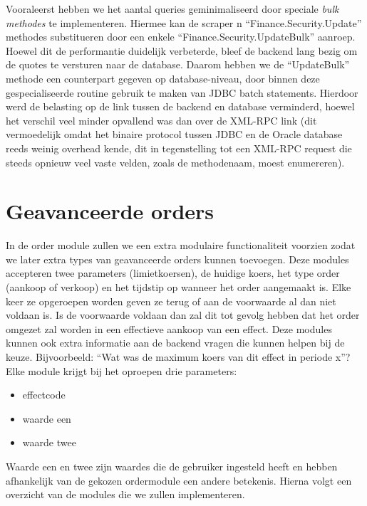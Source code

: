 Vooraleerst hebben we het aantal queries geminimaliseerd door speciale \emph{bulk methodes} te implementeren. Hiermee kan de scraper n ``Finance.Security.Update'' methodes substitueren door een enkele ``Finance.Security.UpdateBulk'' aanroep. Hoewel dit de performantie duidelijk verbeterde, bleef de backend lang bezig om de quotes te versturen naar de database. Daarom hebben we de ``UpdateBulk'' methode een counterpart gegeven op database-niveau, door binnen deze gespecialiseerde routine gebruik te maken van JDBC batch statements. Hierdoor werd de belasting op de link tussen de backend en database verminderd, hoewel het verschil veel minder opvallend was dan over de XML-RPC link (dit vermoedelijk omdat het binaire protocol tussen JDBC en de Oracle database reeds weinig overhead kende, dit in tegenstelling tot een XML-RPC request die steeds opnieuw veel vaste velden, zoals de methodenaam, moest enumereren).



%
%

\chapter{Geavanceerde orders}
\label{chap:geavanceerde_orders}

In de order module zullen we een extra modulaire functionaliteit voorzien zodat we later extra types van geavanceerde orders kunnen toevoegen.
Deze modules accepteren twee parameters (limietkoersen), de huidige koers, het type order (aankoop of verkoop) en het tijdstip op wanneer het order aangemaakt is. Elke keer ze opgeroepen worden geven ze terug of aan de voorwaarde al dan niet voldaan is. Is de voorwaarde voldaan dan zal dit tot gevolg hebben dat het order omgezet zal worden in een effectieve aankoop van een effect.
Deze modules kunnen ook extra informatie aan de backend vragen die kunnen helpen bij de keuze. Bijvoorbeeld: ``Wat was de maximum koers van dit effect in periode x''?
Elke module krijgt bij het oproepen drie parameters:
\begin{itemize}
\item{effectcode}
\item{waarde een}
\item{waarde twee}
\end{itemize}

Waarde een en twee zijn waardes die de gebruiker ingesteld heeft en hebben afhankelijk van de gekozen ordermodule een andere betekenis.
Hierna volgt een overzicht van de modules die we zullen implementeren.

